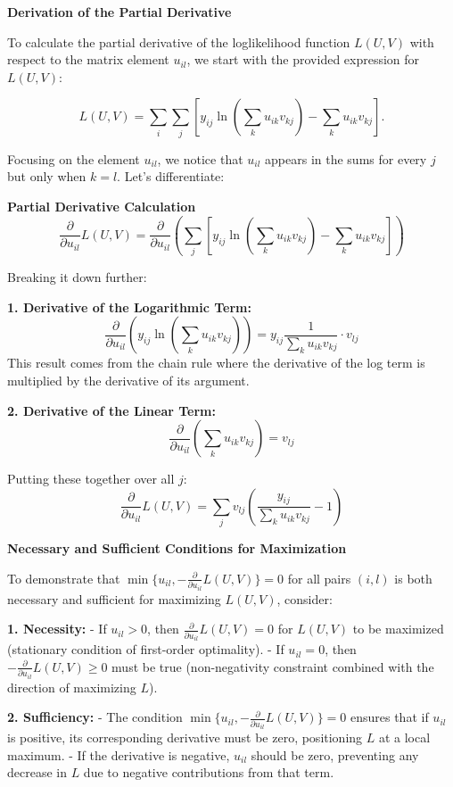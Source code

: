 \documentclass[8pt]{article}
\begin{document}
{\textbf{Derivation of the Partial Derivative}

To calculate the partial derivative of the loglikelihood function \(L(U, V)\) with respect to the matrix element \(u_{il}\), we start with the provided expression for \(L(U, V)\):

\[
L(U, V) = \sum_i \sum_j \left[ y_{ij} \ln \left( \sum_k u_{ik}v_{kj} \right) - \sum_k u_{ik}v_{kj} \right].
\]

Focusing on the element \(u_{il}\), we notice that \(u_{il}\) appears in the sums for every \(j\) but only when \(k = l\). Let's differentiate:

\textbf{Partial Derivative Calculation
}
\[
\frac{\partial}{\partial u_{il}} L(U, V) = \frac{\partial}{\partial u_{il}} \left( \sum_j \left[ y_{ij} \ln \left( \sum_k u_{ik}v_{kj} \right) - \sum_k u_{ik}v_{kj} \right] \right)
\]

Breaking it down further:

\textbf{1. Derivative of the Logarithmic Term:}
   \[
   \frac{\partial}{\partial u_{il}} \left( y_{ij} \ln \left( \sum_k u_{ik}v_{kj} \right) \right) = y_{ij} \frac{1}{\sum_k u_{ik}v_{kj}} \cdot v_{lj}
   \]
   This result comes from the chain rule where the derivative of the log term is multiplied by the derivative of its argument.

\textbf{2. Derivative of the Linear Term:}
   \[
   \frac{\partial}{\partial u_{il}} \left( \sum_k u_{ik}v_{kj} \right) = v_{lj}
   \]

Putting these together over all \(j\):
\[
\frac{\partial}{\partial u_{il}} L(U, V) = \sum_j v_{lj} \left( \frac{y_{ij}}{\sum_k u_{ik}v_{kj}} - 1 \right)
\]

\textbf{Necessary and Sufficient Conditions for Maximization}

To demonstrate that \(\min\{u_{il}, - \frac{\partial}{\partial u_{il}} L(U, V)\} = 0\) for all pairs \((i, l)\) is both necessary and sufficient for maximizing \(L(U, V)\), consider:

\textbf{1. Necessity:}
   - If \(u_{il} > 0\), then \(\frac{\partial}{\partial u_{il}} L(U, V) = 0\) for \(L(U, V)\) to be maximized (stationary condition of first-order optimality).
   - If \(u_{il} = 0\), then \(-\frac{\partial}{\partial u_{il}} L(U, V) \geq 0\) must be true (non-negativity constraint combined with the direction of maximizing \(L\)).

\textbf{2. Sufficiency:}
   - The condition \(\min\{u_{il}, - \frac{\partial}{\partial u_{il}} L(U, V)\} = 0\) ensures that if \(u_{il}\) is positive, its corresponding derivative must be zero, positioning \(L\) at a local maximum.
   - If the derivative is negative, \(u_{il}\) should be zero, preventing any decrease in \(L\) due to negative contributions from that term.

}
\end{document}
